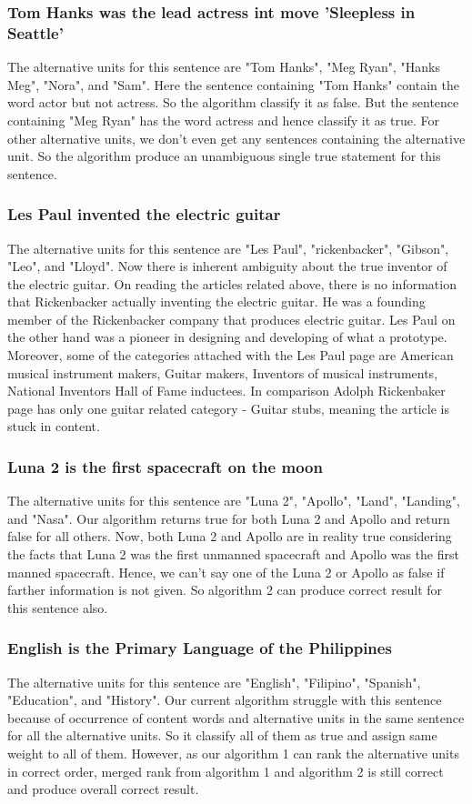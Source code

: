 \documentclass[11pt]{article}
\begin{document}
\subsubsection{Tom Hanks was the lead actress  int move 'Sleepless in Seattle'}
The alternative units for this sentence are "Tom Hanks", "Meg Ryan", "Hanks Meg", "Nora", and "Sam". Here the sentence containing "Tom Hanks" contain the word actor but not actress. So the algorithm classify it as false. But the sentence containing "Meg Ryan" has the word actress and hence classify it as true. For other alternative units, we don't even get any sentences containing the alternative unit. So the algorithm produce an unambiguous single true statement for this sentence.

\subsubsection{Les Paul invented the electric guitar}
The alternative units for this sentence are "Les Paul", "rickenbacker", "Gibson", "Leo", and "Lloyd". Now there is inherent ambiguity about the true inventor of the electric guitar. On reading the articles related above, there is no information that Rickenbacker actually inventing the electric guitar. He was a founding member of the Rickenbacker company that produces electric guitar. Les Paul on the other hand was a pioneer in designing and developing of what a prototype. Moreover, some of the categories attached with the Les Paul page are American musical instrument makers, Guitar makers, Inventors of musical instruments, National Inventors Hall of Fame inductees. In comparison Adolph Rickenbaker page has only one guitar related category - Guitar stubs, meaning the article is stuck in content.

\subsubsection{Luna 2 is the first spacecraft on the moon}
The alternative units for this sentence are "Luna 2", "Apollo", "Land", "Landing", and "Nasa". Our algorithm returns true for both Luna 2 and Apollo and return false for all others. Now, both Luna 2 and Apollo are in reality true considering the facts that Luna 2 was the first unmanned spacecraft and Apollo was the first manned spacecraft. Hence, we can't say one of the Luna 2 or Apollo as false if farther information is not given. So algorithm 2 can produce correct result for this sentence also.

\subsubsection{English is the Primary Language of the Philippines}
The alternative units for this sentence are "English", "Filipino", "Spanish", "Education", and "History". Our current algorithm struggle with this sentence because of occurrence of content words and alternative units in the same sentence for all the alternative units. So it classify all of them as true and assign same weight to all of them. However, as our algorithm 1 can rank the alternative units in correct order, merged rank from algorithm 1 and algorithm 2 is still correct and produce overall correct result. 
\end{document}
